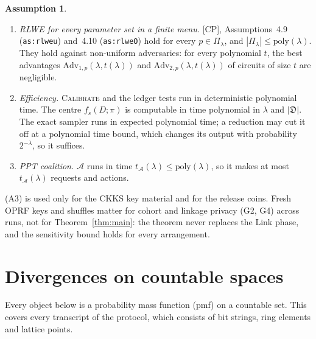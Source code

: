 \documentclass[11pt]{article}
\theoremstyle{definition}
\newtheorem{assumption}[definition]{Assumption}
\theoremstyle{plain}
\newcommand{\fs}{f}
\newcommand{\bD}{\mathfrak D}
\newcommand{\Adv}{\mathrm{Adv}}
\newcommand{\Cal}{\textsc{Calibrate}}
\newcommand{\CP}{\textup{[CP]}}
\begin{document}
\begin{assumption}
\begin{enumerate}[nosep,label=(A\arabic*)]
\begin{itemize}[nosep]
  \end{itemize}
  \item \emph{RLWE for every parameter set in a finite menu.} \CP, Assumptions~4.9 (\texttt{as:rlweu}) and~4.10 (\texttt{as:rlweO}) hold for every $p\in\Pi_\lambda$, and $|\Pi_\lambda|\le\mathrm{poly}(\lambda)$. They hold against non-uniform adversaries: for every polynomial $t$, the best advantages $\Adv_{1,p}(\lambda,t(\lambda))$ and $\Adv_{2,p}(\lambda,t(\lambda))$ of circuits of size $t$ are negligible.
  \item \emph{Efficiency.} \Cal{} and the ledger tests run in deterministic polynomial time. The centre $\fs_s(D;\pi)$ is computable in time polynomial in $\lambda$ and $|\bD|$. The exact sampler runs in expected polynomial time; a reduction may cut it off at a polynomial time bound, which changes its output with probability $2^{-\lambda}$, so it suffices.
  \item \emph{PPT coalition.} $\mathcal A$ runs in time $t_{\mathcal A}(\lambda)\le\mathrm{poly}(\lambda)$, so it makes at most $t_{\mathcal A}(\lambda)$ requests and actions.
\end{enumerate}
\end{assumption}

(A3) is used only for the CKKS key material and for the release coins. Fresh OPRF keys and shuffles matter for cohort and linkage privacy (G2, G4) across runs, not for Theorem~\ref{thm:main}: the theorem never replaces the Link phase, and the sensitivity bound holds for every arrangement.

\section{Divergences on countable spaces}
\label{sec:div}

Every object below is a probability mass function (pmf) on a countable set. This covers every transcript of the protocol, which consists of bit strings, ring elements and lattice points.
\end{document}
